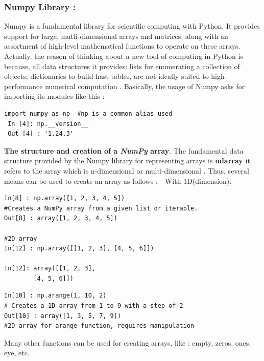 \documentclass[12pt,a4paper]{report}
\begin{document}
 \subsubsection*{{\large Numpy Library :}}
 Numpy is a fundamental library for scientific computing with Python. It provides support for large, mutli-dimensional arrays and matrices, along with an assortment of high-level mathematical functions to operate on these arrays.\newline 
 Actually, the reason of thinking about a new tool of computing in Python is because, all  data structures it provides: lists for enumerating a collection of objects, dictionaries to build hast tables, are not ideally suited to high-performance numerical computation \cite{van2011numpy}.\newline 
 Basically, the usage of Numpy asks for importing its modules like this :  
 \begin{lstlisting}[style=stylepython]
 import numpy as np  #np is a common alias used  
 In [4]: np.__version__
 Out [4] : '1.24.3'
 \end{lstlisting} 
 \textbf{The structure and creation of a \textit{NumPy} array}. The fundamental data structure provided by the Numpy library for representing arrays is \textbf{ndarray} it refers to the array which is n-dimensional or multi-dimensional \cite{coursAnalyseDonne2}. Thus, several means can be used to create an array as follows  : \newline
 - With 1D(dimension):
 \begin{lstlisting}[style=stylepython]
In[8] : np.array([1, 2, 3, 4, 5])
#Creates a NumPy array from a given list or iterable.
Out[8] : array([1, 2, 3, 4, 5]) 

#2D array
In[12] : np.array([[1, 2, 3], [4, 5, 6]])

In[12]: array([[1, 2, 3],
		[4, 5, 6]])
 \end{lstlisting}
 \begin{lstlisting}[style=stylepython]
In[10] : np.arange(1, 10, 2)  
# Creates a 1D array from 1 to 9 with a step of 2
Out[10] : array([1, 3, 5, 7, 9]) 
#2D array for arange function, requires manipulation
 \end{lstlisting} 
  Many other functions can be used for creating arrays, like : empty, zeros, ones, eye, etc. \\
  
\end{document}
